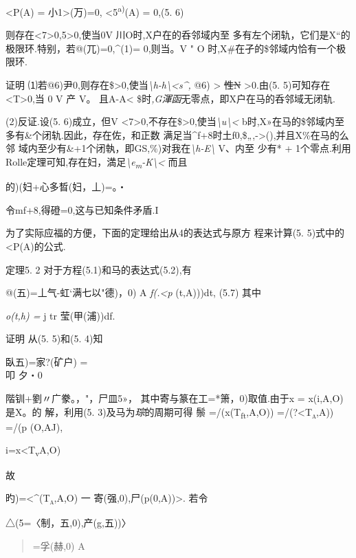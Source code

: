 \documentclass{article}
\begin{document}
\textless{}P(A) = 小1\textgreater{}(万)=0,
\textless{}5\textsuperscript{a)}(A) = 0,(5. 6)

则存在\textless{}7\textgreater{}0,5\textgreater{}0,使当0V
\textbar{}川O时,X户在的呑邻域内至
多有左个闭轨，它们是X``的极限环.特别，若@(兀)=0,\^{}(1)= 0,则当。V
\textbar{}"\textbar{} O 时,X\#在孑的\$邻域内恰有一个极限环.

证明
⑴若@6)尹0,则存在\$\textgreater{}0,使当\emph{\textbackslash{}h-h\textbackslash{}\textless{}s\^{},}
\textbar{}@6)\textbar{} \textgreater{} \sout{性N} \textgreater{}0.由(5.
5)可知存在 \textless{}T\textgreater{}0,当 0 V \textbar{}产\textbar{} V。
且\textbar{}A-A\textbar{}\textless{}
\$时\emph{,G渾函}无零点，即X户在马的呑邻域无闭轨.

(2)反证.设(5. 6)成立，但V
\textless{}7\textgreater{}0,不存在\$\textgreater{}0,使当\emph{\textbackslash{}u\textbackslash{}\textless{}}
b时,X»在马的\$邻域内至多有\&个闭轨.因此，存在佐，和正数
满足当\^{}f+8时土f0,\$„,-\textgreater{}(),并且X\%在马的么邻
域内至少有\&+1个闭執，即GS,\%)对我在\emph{\textbackslash{}h-E\textbackslash{}}
V、内至 少有* +
1个零点.利用Rolle定理可知,存在妇，満足\emph{\textbackslash{}e\textsubscript{m}-K\textbackslash{}\textless{}}
而且

的)(妇+心多晳(妇，丄)=。・

令mf+8,得磴=0,这与已知条件矛盾.I

为了实际应福的方便，下面的定理给出从4的表达式与原方 程来计算(5.
5)式中的\textless{}P(A)的公式.

定理5. 2 对于方程(5.1)和马的表达式(5.2),有

@(五)=丄气-虹`满七以"德)，0) A \emph{f(.\textless{}p} (t,A)))dt, (5.7)
其中

\emph{o(t,h) =} j tr 莹(甲(浦))df.

证明 从(5. 5)和(5. 4)知

臥五)=家?(矿户) =\\
叩 夕・0

階钏+劉\textbar{}〃广豢。，"，尸皿5»， 其中寄与篆在工=*箫，0)取值.由于x
= x(i,A,O)是X。的 解，利用(5. 3)及马为\emph{琮}的周期可得 鬃
=/(x(T\textsubscript{ft},A,O))
\textsc{=/(?\textless{}T\textsubscript{a},A))} =/(p (O,AJ),

i=x\textless{}T\textsubscript{v}A,O)

故

旳)=\textsc{\textless{}\^{}(T\textsubscript{a},A,O)} 一
寄(强,0),尸(p(0,A))\textgreater{}. 若令

△(5=〈制，五,0),产(g,五))〉

\begin{quote}
=孚(赫,0) A
\end{quote}
\end{document}
